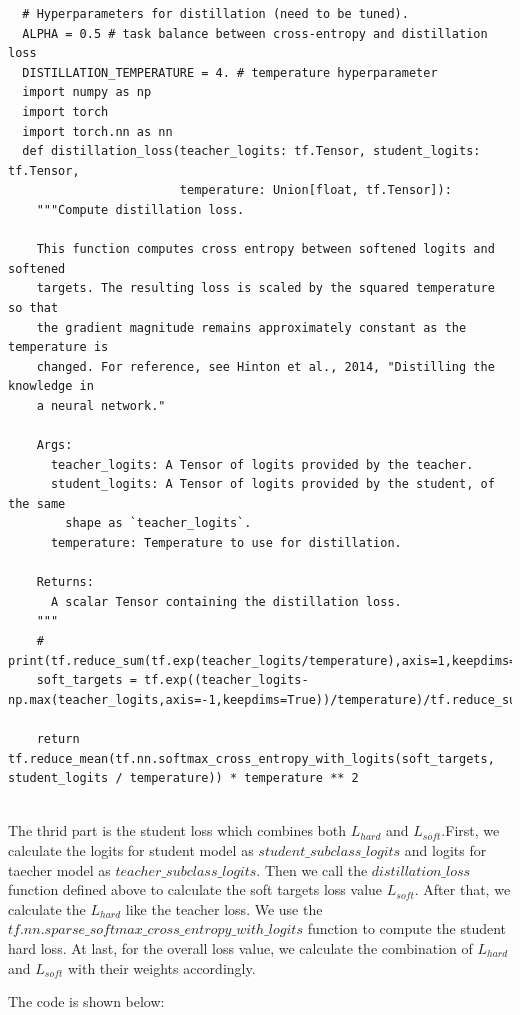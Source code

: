 \documentclass[conference]{IEEEtran}
\begin{document}
  \begin{lstlisting}
  # Hyperparameters for distillation (need to be tuned).
  ALPHA = 0.5 # task balance between cross-entropy and distillation loss
  DISTILLATION_TEMPERATURE = 4. # temperature hyperparameter
  import numpy as np
  import torch
  import torch.nn as nn
  def distillation_loss(teacher_logits: tf.Tensor, student_logits: tf.Tensor,
                        temperature: Union[float, tf.Tensor]):
    """Compute distillation loss.
  
    This function computes cross entropy between softened logits and softened
    targets. The resulting loss is scaled by the squared temperature so that
    the gradient magnitude remains approximately constant as the temperature is
    changed. For reference, see Hinton et al., 2014, "Distilling the knowledge in
    a neural network."
  
    Args:
      teacher_logits: A Tensor of logits provided by the teacher.
      student_logits: A Tensor of logits provided by the student, of the same
        shape as `teacher_logits`.
      temperature: Temperature to use for distillation.
  
    Returns:
      A scalar Tensor containing the distillation loss.
    """
    # print(tf.reduce_sum(tf.exp(teacher_logits/temperature),axis=1,keepdims=True).shape)
    soft_targets = tf.exp((teacher_logits-np.max(teacher_logits,axis=-1,keepdims=True))/temperature)/tf.reduce_sum(tf.exp(np.max(teacher_logits,axis=-1,keepdims=True)/temperature),axis=1,keepdims=True)
  
    return tf.reduce_mean(tf.nn.softmax_cross_entropy_with_logits(soft_targets, student_logits / temperature)) * temperature ** 2
  
  \end{lstlisting}
  The thrid part is the student loss which combines both $L_{hard}$ and $L_{soft}$.First, we calculate the logits for student model as $student\_subclass\_logits$ and logits for taecher model as $teacher\_subclass\_logits$.
  Then we call the $distillation\_loss$ function defined above to calculate the soft targets loss value $L_{soft}$.
  After that, we calculate the $L_{hard}$ like the teacher loss. We use the $tf.nn.sparse\_softmax\_cross\_entropy\_with\_logits$ function to compute the student hard loss.
  At last, for the overall loss value, we calculate the combination of $L_{hard}$ and $L_{soft}$ with their weights accordingly.\par
  The code is shown below:
\end{document}
